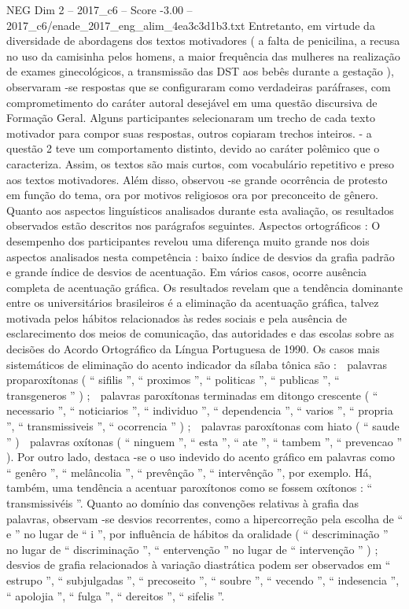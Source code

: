 \begin{textsample}{NEG Dim 2 – 2017\_c6 – Score -3.00 – 2017\_c6/enade\_2017\_eng\_alim\_4ea3c3d1b3.txt}
Entretanto, em virtude da diversidade de abordagens dos textos motivadores ( a falta de penicilina, a recusa no uso da camisinha pelos homens, a maior frequência das mulheres na realização de exames ginecológicos, a transmissão das DST aos bebês durante a gestação ), observaram -se respostas que se configuraram como verdadeiras paráfrases, com comprometimento do caráter autoral desejável em uma questão discursiva de Formação Geral.
Alguns participantes selecionaram um trecho de cada texto motivador para compor suas respostas, outros copiaram trechos inteiros. - a questão 2 teve um comportamento distinto, devido ao caráter polêmico que o caracteriza.
Assim, os textos são mais curtos, com vocabulário repetitivo e preso aos textos motivadores.
Além disso, observou -se grande ocorrência de protesto em função do tema, ora por motivos religiosos ora por preconceito de gênero.
Quanto aos aspectos linguísticos analisados durante esta avaliação, os resultados observados estão descritos nos parágrafos seguintes.
Aspectos ortográficos : O desempenho dos participantes revelou uma diferença muito grande nos dois aspectos analisados nesta competência : baixo índice de desvios da grafia padrão e grande índice de desvios de acentuação.
Em vários casos, ocorre ausência completa de acentuação gráfica.
Os resultados revelam que a tendência dominante entre os universitários brasileiros é a eliminação da acentuação gráfica, talvez motivada pelos hábitos relacionados às redes sociais e pela ausência de esclarecimento dos meios de comunicação, das autoridades e das escolas sobre as decisões do Acordo Ortográfico da Língua Portuguesa de 1990.
Os casos mais sistemáticos de eliminação do acento indicador da sílaba tônica são :  palavras proparoxítonas ( “ sifilis ”, “ proximos ”, “ politicas ”, “ publicas ”, “ transgeneros ” ) ;  palavras paroxítonas terminadas em ditongo crescente ( “ necessario ”, “ noticiarios ”, “ individuo ”, “ dependencia ”, “ varios ”, “ propria ”, “ transmissiveis ”, “ ocorrencia ” ) ;  palavras paroxítonas com hiato ( “ saude ” )  palavras oxítonas ( “ ninguem ”, “ esta ”, “ ate ”, “ tambem ”, “ prevencao ” ).
Por outro lado, destaca -se o uso indevido do acento gráfico em palavras como “ genêro ”, “ melâncolia ”, “ prevênção ”, “ intervênção ”, por exemplo.
Há, também, uma tendência a acentuar paroxítonos como se fossem oxítonos : “ transmissivéis ”.
Quanto ao domínio das convenções relativas à grafia das palavras, observam -se desvios recorrentes, como a hipercorreção pela escolha de “ e ” no lugar de “ i ”, por influência de hábitos da oralidade ( “ descriminação ” no lugar de “ discriminação ”, “ entervenção ” no lugar de “ intervenção ” ) ; desvios de grafia relacionados à variação diastrática podem ser observados em “ estrupo ”, “ subjulgadas ”, “ precoseito ”, “ soubre ”, “ vecendo ”, “ indesencia ”, “ apolojia ”, “ fulga ”, “ dereitos ”, “ sifelis ”.

\end{textsample}
